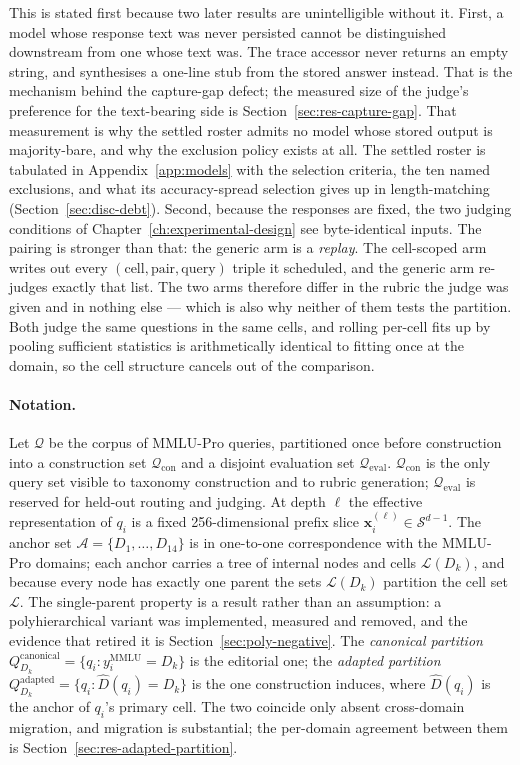 This is stated first because two later results are unintelligible
without it. First, a model whose response text was never persisted
cannot be distinguished downstream from one whose text was. The trace
accessor never returns an empty string, and synthesises a one-line stub
from the stored answer instead. That is the mechanism behind the
capture-gap defect; the measured size of the judge's preference for
the text-bearing side is Section~\ref{sec:res-capture-gap}. That
measurement is why the settled roster admits no model whose stored
output is majority-bare, and why the exclusion policy exists at all.
The settled roster is tabulated in Appendix~\ref{app:models} with the
selection criteria, the ten named exclusions, and what its
accuracy-spread selection gives up in length-matching
(Section~\ref{sec:disc-debt}).
Second, because the responses are fixed, the two judging conditions of
Chapter~\ref{ch:experimental-design} see byte-identical inputs. The
pairing is stronger than that: the generic arm is a \emph{replay}. The
cell-scoped arm writes out every $(\text{cell}, \text{pair},
\text{query})$ triple it scheduled, and the generic arm re-judges
exactly that list. The two arms therefore differ in the rubric the judge
was given and in nothing else --- which is also why neither of them
tests the partition. Both judge the same questions in the same cells,
and rolling per-cell fits up by pooling sufficient statistics is
arithmetically identical to fitting once at the domain, so the cell
structure cancels out of the comparison.

\paragraph{Notation.}
Let $\mathcal{Q}$ be the corpus of MMLU-Pro queries, partitioned once
before construction into a construction set $\mathcal{Q}_{\text{con}}$
and a disjoint evaluation set $\mathcal{Q}_{\text{eval}}$.
$\mathcal{Q}_{\text{con}}$ is the only query set visible to taxonomy
construction and to rubric generation; $\mathcal{Q}_{\text{eval}}$ is
reserved for held-out routing and judging.
At depth $\ell$ the effective representation of $q_i$ is a fixed
256-dimensional prefix slice
$\mathbf{x}_i^{(\ell)} \in \mathcal{S}^{d-1}$.
The anchor set $\mathcal{A} = \{D_1, \ldots, D_{14}\}$ is in one-to-one
correspondence with the MMLU-Pro domains; each anchor carries a tree of
internal nodes and cells $\mathcal{L}(D_k)$, and because every node has
exactly one parent the sets $\mathcal{L}(D_k)$ partition the cell set
$\mathcal{L}$. The single-parent property is a result rather than an
assumption: a polyhierarchical variant was implemented, measured and
removed, and the evidence that retired it is
Section~\ref{sec:poly-negative}.
The \textit{canonical partition}
$Q_{D_k}^{\text{canonical}} = \{q_i : y_i^{\text{MMLU}} = D_k\}$ is the
editorial one; the \textit{adapted partition}
$Q_{D_k}^{\text{adapted}} = \{q_i : \hat{D}(q_i) = D_k\}$ is the one
construction induces, where $\hat{D}(q_i)$ is the anchor of $q_i$'s
primary cell. The two coincide only absent cross-domain migration, and
migration is substantial; the per-domain agreement between them is
Section~\ref{sec:res-adapted-partition}.

